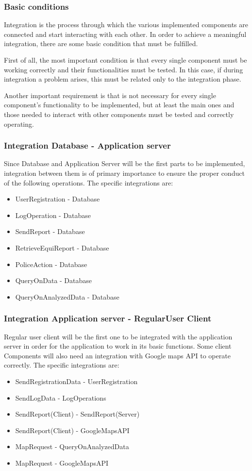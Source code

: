 \subsubsection{Basic conditions}
Integration is the process through which the various implemented components are connected and start interacting with each other.
In order to achieve a meaningful integration, there are some basic condition that must be fulfilled. \par
First of all, the most important condition is that every single component must be working correctly and their functionalities must be tested. In this case, if during integration a problem arises, this must be related only to the integration phase. \par
Another important requirement is that is not necessary for every single component's functionality to be implemented, but at least the main ones and those needed to interact with other components must be tested and correctly operating.

\subsubsection{Integration Database - Application server}
Since Database and Application Server will be the first parts to be implemented, integration between them is of primary importance to ensure the proper conduct of the following operations.
The specific integrations are:
\begin{itemize}
	\item UserRegistration - Database
	\item LogOperation - Database
	\item SendReport - Database
	\item RetrieveEquiReport - Database
	\item PoliceAction - Database
	\item QueryOnData - Database
	\item QueryOnAnalyzedData - Database
\end{itemize}

\subsubsection{Integration Application server - RegularUser Client}
Regular user client will be the first one to be integrated with the application server in order for the application to work in its basic functions.
Some client Components will also need an integration with Google maps API to operate correctly.
The specific integrations are:
\begin{itemize}
	\item SendRegistrationData - UserRegistration
	\item SendLogData - LogOperations
	\item SendReport(Client) - SendReport(Server)
	\item SendReport(Client) - GoogleMapsAPI
	\item MapRequest - QueryOnAnalyzedData
	\item MapRequest - GoogleMapsAPI
\end{itemize}

